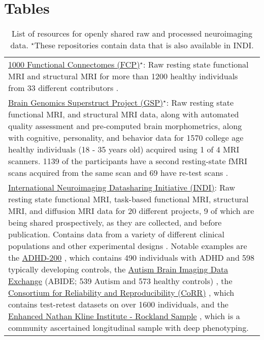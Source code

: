 \documentclass{bmcart}
\begin{document}
\begin{backmatter}
\begin{figure}[h!]
  \caption{}
      \end{figure}
	  
\section*{Tables}

\renewcommand{\arraystretch}{1.5}

\begin{table}[h!]
\caption{List of resources for openly shared raw and processed neuroimaging data. $^{\star}$These repositories contain data that is also available in INDI.}
\label{Table1}
      \begin{tabular}{L{5.5in}}
        \hline
        \href{http://fcon_1000.projects.nitrc.org}{1000 Functional Connectomes (FCP)}$^{\star}$: Raw resting state functional MRI and structural MRI for more than 1200 healthy individuals from 33 different contributors \cite{Biswal2010}. \\ 
		\href{https://thedata.harvard.edu/dvn/dv/GSP}{Brain Genomics Superstruct Project (GSP)}$^{\star}$: Raw resting state functional MRI, and structural MRI data, along with automated quality assessment and pre-computed brain morphometrics, along with cognitive, personality, and behavior data for 1570 college age healthy individuals (18 - 35 years old) acquired using 1 of 4 MRI scanners. 1139 of the participants have a second resting-state fMRI scans acquired from the same scan and 69 have re-test scans \cite{BucknerGSP2014}.\\
		\href{http://fcon_1000.projects.nitrc.org}{International Neuroimaging Datasharing Initiative (INDI)}: Raw resting state functional MRI, task-based functional MRI, structural MRI, and diffusion MRI data for 20 different projects, 9 of which are being shared prospectively, as they are collected, and before publication. Contains data from a variety of different clinical populations and other experimental designs \cite{Mennes2013}. Notable examples are the \href{http://fcon_1000.projects.nitrc.org/indi/adhd200}{ADHD-200} \cite{Milham2012adhd}, which contains 490 individuals with ADHD and 598 typically developing controls, the \href{http://fcon_1000.projects.nitrc.org/indi/abide}{Autism Brain Imaging Data Exchange} (ABIDE; 539 Autism and 573 healthy controls) \cite{DiMartino2014}, the \href{http://fcon_1000.projects.nitrc.org/indi/CoRR/html/}{Consortium for Reliability and Reproducibility (CoRR)} \cite{Zuo2014}, which contains test-retest datasets on over 1600 individuals, and the \href{http://fcon_1000.projects.nitrc.org/indi/enhanced/}{Enhanced Nathan Kline Institute - Rockland Sample} \cite{Nooner2012}, which is a community ascertained longitudinal sample with deep phenotyping. \\

\end{tabular}
\end{table}
\end{backmatter}
\end{document}
